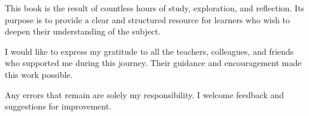 This book is the result of countless hours of study, exploration, and reflection.  
Its purpose is to provide a clear and structured resource for learners who wish to deepen their understanding of the subject.

\vspace{1em}
I would like to express my gratitude to all the teachers, colleagues, and friends who supported me during this journey. Their guidance and encouragement made this work possible.

\vspace{1em}
Any errors that remain are solely my responsibility. I welcome feedback and suggestions for improvement.